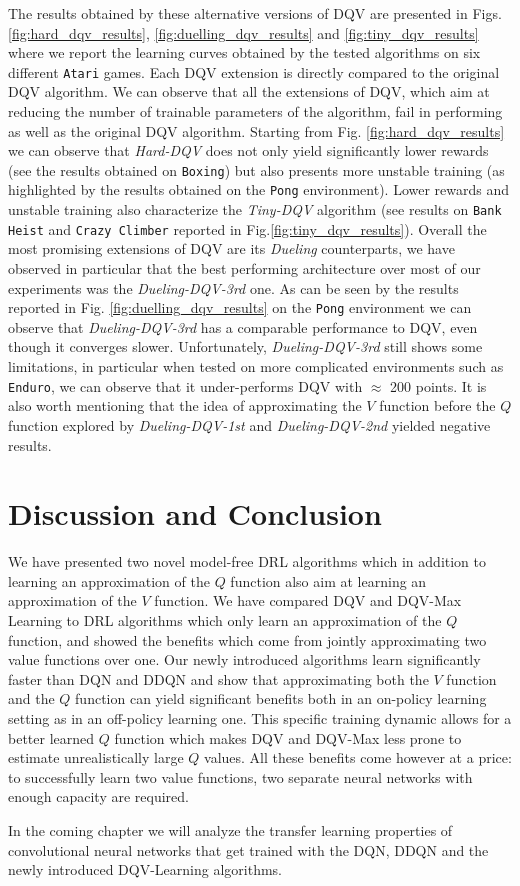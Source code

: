 The results obtained by these alternative versions of DQV are presented in Figs. \ref{fig:hard_dqv_results}, \ref{fig:duelling_dqv_results} and \ref{fig:tiny_dqv_results} where we report the learning curves obtained by the tested algorithms on six different \texttt{Atari} games. Each DQV extension is directly compared to the original DQV algorithm. We can observe that all the extensions of DQV, which aim at reducing the number of trainable parameters of the algorithm, fail in performing as well as the original DQV algorithm. Starting from Fig. \ref{fig:hard_dqv_results} we can observe that \textit{Hard-DQV} does not only yield significantly lower rewards (see the results obtained on \texttt{Boxing}) but also presents more unstable training (as highlighted by the results obtained on the \texttt{Pong} environment). Lower rewards and unstable training also characterize the \textit{Tiny-DQV} algorithm (see results on \texttt{Bank Heist} and \texttt{Crazy Climber} reported in Fig.\ref{fig:tiny_dqv_results}). Overall the most promising extensions of DQV are its \textit{Dueling} counterparts, we have observed in particular that the best performing architecture over most of our experiments was the \textit{Dueling-DQV-3rd} one. As can be seen by the results reported in Fig. \ref{fig:duelling_dqv_results} on the \texttt{Pong} environment we can observe that \textit{Dueling-DQV-3rd} has a comparable performance to DQV, even though it converges slower. Unfortunately, \textit{Dueling-DQV-3rd} still shows some limitations, in particular when tested on more complicated environments such as \texttt{Enduro}, we can observe that it under-performs DQV with $\approx$ 200 points. It is also worth mentioning that the idea of approximating the $V$ function before the $Q$ function explored by \textit{Dueling-DQV-1st} and \textit{Dueling-DQV-2nd} yielded negative results.






\section{Discussion and Conclusion}
\label{sec:ijcnn_discussion}

We have presented two novel model-free DRL algorithms which in addition to learning an approximation of the $Q$ function also aim at learning an approximation of the $V$ function. We have compared DQV and DQV-Max Learning to DRL algorithms which only learn an approximation of the $Q$ function, and showed the benefits which come from jointly approximating two value functions over one. Our newly introduced algorithms learn significantly faster than DQN and DDQN and show that approximating both the $V$ function and the $Q$ function can yield significant benefits both in an on-policy learning setting as in an off-policy learning one. This specific training dynamic allows for a better learned $Q$ function which makes DQV and DQV-Max less prone to estimate unrealistically large $Q$ values. All these benefits come however at a price: to successfully learn two value functions, two separate neural networks with enough capacity are required. 

In the coming chapter we will analyze the transfer learning properties of convolutional neural networks that get trained with the DQN, DDQN and the newly introduced DQV-Learning algorithms.
